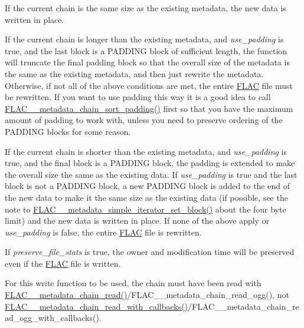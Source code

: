 If the current chain is the same size as the existing metadata, the new data is written in place.

If the current chain is longer than the existing metadata, and {\itshape use\+\_\+padding} is {\ttfamily true}, and the last block is a P\+A\+D\+D\+I\+NG block of sufficient length, the function will truncate the final padding block so that the overall size of the metadata is the same as the existing metadata, and then just rewrite the metadata. Otherwise, if not all of the above conditions are met, the entire \hyperlink{namespace_f_l_a_c}{F\+L\+AC} file must be rewritten. If you want to use padding this way it is a good idea to call \hyperlink{group__flac__metadata__level2_gaa14304da1c8e706808cfafa5cbbf575b}{F\+L\+A\+C\+\_\+\+\_\+metadata\+\_\+chain\+\_\+sort\+\_\+padding()} first so that you have the maximum amount of padding to work with, unless you need to preserve ordering of the P\+A\+D\+D\+I\+NG blocks for some reason.

If the current chain is shorter than the existing metadata, and {\itshape use\+\_\+padding} is {\ttfamily true}, and the final block is a P\+A\+D\+D\+I\+NG block, the padding is extended to make the overall size the same as the existing data. If {\itshape use\+\_\+padding} is {\ttfamily true} and the last block is not a P\+A\+D\+D\+I\+NG block, a new P\+A\+D\+D\+I\+NG block is added to the end of the new data to make it the same size as the existing data (if possible, see the note to \hyperlink{group__flac__metadata__level1_ga7d1ceb2db292c968ae6ac18ecb15c356}{F\+L\+A\+C\+\_\+\+\_\+metadata\+\_\+simple\+\_\+iterator\+\_\+set\+\_\+block()} about the four byte limit) and the new data is written in place. If none of the above apply or {\itshape use\+\_\+padding} is {\ttfamily false}, the entire \hyperlink{namespace_f_l_a_c}{F\+L\+AC} file is rewritten.

If {\itshape preserve\+\_\+file\+\_\+stats} is {\ttfamily true}, the owner and modification time will be preserved even if the \hyperlink{namespace_f_l_a_c}{F\+L\+AC} file is written.

For this write function to be used, the chain must have been read with \hyperlink{group__flac__metadata__level2_gadb7d8e9a82aeb43e256f0a948adf5c45}{F\+L\+A\+C\+\_\+\+\_\+metadata\+\_\+chain\+\_\+read()}/\+F\+L\+A\+C\+\_\+\+\_\+metadata\+\_\+chain\+\_\+read\+\_\+ogg(), not \hyperlink{group__flac__metadata__level2_ga061ae21b7836cd26f13345b897f05f3e}{F\+L\+A\+C\+\_\+\+\_\+metadata\+\_\+chain\+\_\+read\+\_\+with\+\_\+callbacks()}/\+F\+L\+A\+C\+\_\+\+\_\+metadata\+\_\+chain\+\_\+read\+\_\+ogg\+\_\+with\+\_\+callbacks().


